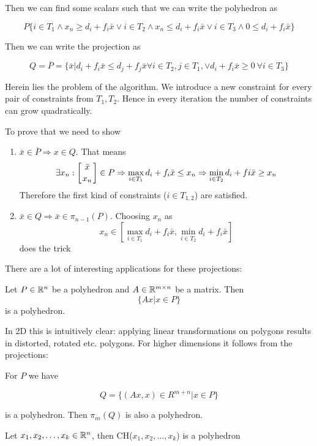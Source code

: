 Then we can find some scalars such that we can write the polyhedron as

\[P \{i\in T_1 \wedge x_n \geq d_i + f_i \bar x \vee i\in T_2 \wedge x_n \leq d_i + f_i \bar x \vee i\in T_3 \wedge 0 \leq d_i + f_i \bar x\}\]

Then we can write the projection as 

\[Q = \overline P = \{\bar x | d_i+f_i\bar x \leq d_j+f_j\bar x \forall i\in T_2,j\in T_1, \vee d_i+f_i\bar x \geq 0\ \forall i\in T_3\}\]

Herein lies the problem of the algorithm. We introduce a new constraint for every pair of constraints from $T_1,T_2$. Hence in every iteration the number of constraints can grow quadratically.

\begin{pr} To prove that we need to show
\begin{enumerate}
\item $\bar x \in \bar P \Rightarrow x\in Q$. That means 
\[\exists x_n: \left[{\bar x}\atop{x_n}\right] \in P \Rightarrow \max_{i\in T_1} d_i +f_i \bar x \leq x_n \Rightarrow \min_{i\in T_2} d_i+fi\bar x \geq x_n\]
Therefore the first kind of constraints ($i \in T_{1,2}$) are satisfied.
\item $\bar x \in Q \Rightarrow \bar x \in \pi_{n-1}(P)$. Choosing $x_n$ as 
\[x_n \in [\max_{i\in T_1} d_i+f_i \bar x, \min_{i\in T_2} d_i+f_i \bar x]\]
does the trick
\end{enumerate}
\end{pr}

There are a lot of interesting applications for these projections:

\begin{thm} Let $P\in \mathbb{R}^n$ be a polyhedron and $A\in \mathbb{R}^{m\times n}$ be a matrix. Then 
\[\{Ax|x\in P\}\]
is a polyhedron.
\end{thm}

In 2D this is intuitively clear: applying linear transformations on polygons results in distorted, rotated etc. polygons. For higher dimensions it follows from the projections:

\begin{pr} For $P$ we have

\[Q=\{(Ax,x)\in R^{m+n}| x\in P\}\]

is a polyhedron. Then $\pi_m(Q)$ is also a polyhedron.
\end{pr}

\begin{cor} Let $x_1,x_2,\ldots, x_k \in \mathbb{R}^n$, then CH($x_1,x_2,\ldots, x_k$) is a polyhedron\end{cor}

